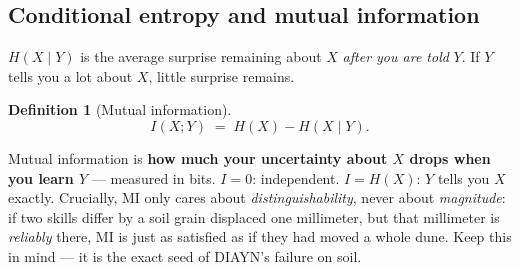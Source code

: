 \documentclass[11pt,a4paper]{article}
\newtheorem{definition}{Definition}
\begin{document}
\subsection{Conditional entropy and mutual information}

$H(X \mid Y)$ is the average surprise remaining about $X$ \emph{after you are
told} $Y$. If $Y$ tells you a lot about $X$, little surprise remains.

\begin{definition}[Mutual information]
\[
I(X;Y) \;=\; H(X) - H(X \mid Y).
\]
\end{definition}

\begin{intuition}
Mutual information is \textbf{how much your uncertainty about $X$ drops when you
learn $Y$} --- measured in bits. $I = 0$: independent. $I = H(X)$: $Y$ tells you
$X$ exactly. Crucially, MI only cares about \emph{distinguishability}, never about
\emph{magnitude}: if two skills differ by a soil grain displaced one millimeter,
but that millimeter is \emph{reliably} there, MI is just as satisfied as if they
had moved a whole dune. Keep this in mind --- it is the exact seed of DIAYN's
failure on soil.
\end{intuition}
\end{document}
